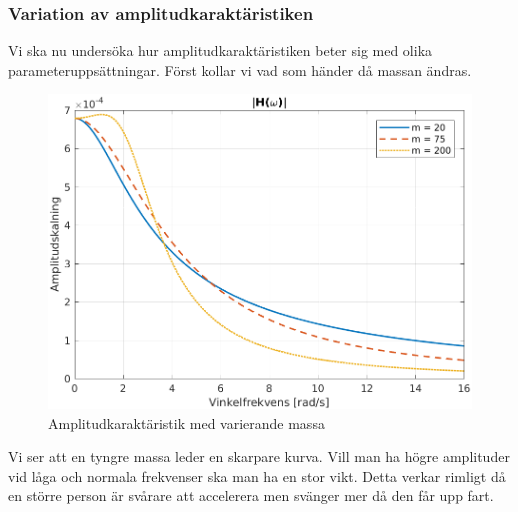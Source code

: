 \subsubsection{Variation av amplitudkaraktäristiken}
Vi ska nu undersöka hur amplitudkaraktäristiken beter sig med olika parameteruppsättningar. Först kollar vi vad som händer då massan ändras.
\begin{figure}[H]
    \centering
    \includegraphics[scale=0.9]{bilder/amplitudkaraktaristik_variation_m}
    \caption{Amplitudkaraktäristik med varierande massa}
    \label{fig:amplitudkaraktaristik_variation_m}
\end{figure}
Vi ser att en tyngre massa leder en skarpare kurva. Vill man ha högre amplituder vid låga och normala frekvenser ska man ha en stor vikt. Detta verkar rimligt då en större person är svårare att accelerera men svänger mer då den får upp fart.

